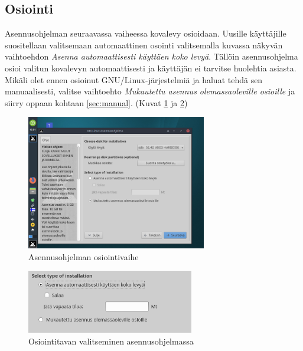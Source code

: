 \documentclass[a4paper, 12pt, finnish]{article}
\begin{document}
\subsection{Osiointi}
Asennusohjelman seuraavassa vaiheessa kovalevy osioidaan. Uusille käyttäjille suositellaan valitsemaan automaattinen osointi valitsemalla kuvassa näkyvän vaihtoehdon \textit{Asenna automaattisesti käyttäen koko levyä}. Tällöin asennusohjelma osioi valitun kovalevyn automaattisesti ja käyttäjän ei tarvitse huolehtia asiasta.
Mikäli olet ennen osioinut GNU/Linux-järjestelmiä ja haluat tehdä sen manuaalisesti, valitse vaihtoehto \textit{Mukautettu asennus olemassaoleville osioille} ja siirry oppaan kohtaan \ref{sec:manual}. (Kuvat \ref{fig:osiointi} ja \ref{fig:auto})

\begin{figure}[htpb]
    \begin{center}
        \includegraphics[width=0.7\textwidth]{asen/osiointi}
        \caption{Asennusohjelman osiointivaihe}
        \label{fig:osiointi}
    \end{center}
\end{figure}
\begin{figure}[htpb]
    \begin{center}
        \includegraphics[width=0.65\textwidth]{asen/osiointi_auto}
        \caption{Osiointitavan valitseminen asennusohjelmassa}
        \label{fig:auto}
    \end{center}
\end{figure}
\end{document}

